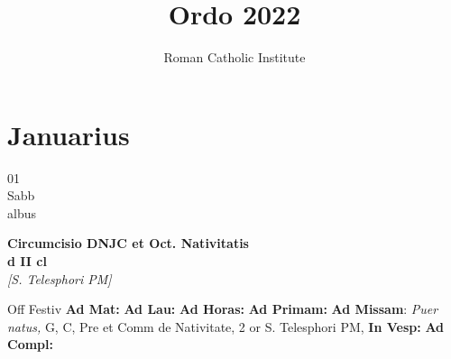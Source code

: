 \documentclass[10pt, openany]{book}
\title{Ordo 2022}
\author{Roman Catholic Institute}
\begin{document}
    \maketitle
    \clearpage\begingroup\pagestyle{empty}\cleardoublepage\endgroup

    \chapter{Januarius}
                    
    \begin{center}
        \begin{minipage}{3.5in}
            \vspace{2em}
            \begin{minipage}{0.5in}
                {\Huge 01} \\
                {\normalsize Sabb} \\
                {\normalsize albus}
            \end{minipage}
            \begin{minipage}{3.0in}
                \textbf{ \large Circumcisio DNJC et Oct. Nativitatis \\
                \textnormal{\normalsize d II cl}} \\ \textit{[S. Telesphori PM]} \\ 
            \end{minipage}
            \begin{justify}Off Festiv
                \textbf{Ad Mat: }
                \textbf{Ad Lau: }
                \textbf{Ad Horas: }
                \textbf{Ad Primam: }\textbf{Ad Missam}: \textit{Puer natus,} G, C, Pre et Comm de Nativitate, 2 or S. Telesphori PM,  
                \textbf{In Vesp: }
                \textbf{Ad Compl: }
            \end{justify}
        \end{minipage}
    \end{center}
\end{document}
